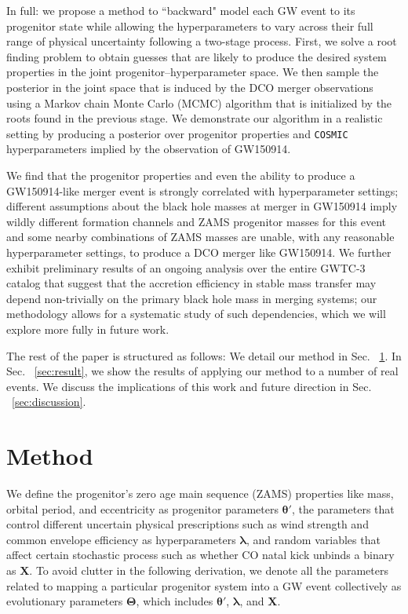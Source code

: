 \documentclass[twocolumn]{aastex631}
\begin{document}
In full: we propose a method to ``backward" model each GW event to its
progenitor state while allowing the hyperparameters to vary across their full
range of physical uncertainty following a two-stage process. First, we solve a
root finding problem to obtain guesses that are likely to produce the desired
system properties in the joint progenitor--hyperparameter space. We then sample
the posterior in the joint space that is induced by the DCO merger observations
using a Markov chain Monte Carlo (MCMC) algorithm that is initialized by the
roots found in the previous stage.  We demonstrate our algorithm in a realistic
setting by producing a posterior over progenitor properties and \texttt{COSMIC}
hyperparameters implied by the observation of GW150914.  

We find that the progenitor properties and even the ability to produce a
GW150914-like merger event is strongly correlated with hyperparameter settings;
different assumptions about the black hole masses at merger in GW150914 imply
wildly different formation channels and ZAMS progenitor masses for this event
and some nearby combinations of ZAMS masses are unable, with any reasonable
hyperparameter settings, to produce a DCO merger like GW150914.  We further
exhibit preliminary results of an ongoing analysis over the entire GWTC-3
catalog \citep{GWTC-3} that suggest that the accretion efficiency in stable mass
transfer may depend non-trivially on the primary black hole mass in merging
systems; our methodology allows for a systematic study of such dependencies,
which we will explore more fully in future work.

The rest of the paper is structured as
follows: We detail our method in Sec. ~\ref{sec:method}. In Sec.
~\ref{sec:result}, we show the results of applying our method to a number of
real events. We discuss the implications of this work and future direction in
Sec. ~\ref{sec:discussion}.

\section{Method}
\label{sec:method}


We define the progenitor's zero age main sequence (ZAMS) properties like
mass, orbital period, and eccentricity as progenitor parameters $\bm{\theta'}$, the parameters
that control different uncertain physical prescriptions such as wind strength and common
envelope efficiency as hyperparameters $\bm{\lambda}$, and random variables
that affect certain stochastic process such as whether CO natal kick unbinds a
binary as $\bm{X}$. To avoid clutter in the following derivation, we denote all
the parameters related to mapping a particular progenitor system into a GW event
collectively as evolutionary parameters $\bm{\Theta}$, which includes
$\bm{\theta'}$, $\bm{\lambda}$, and $\bm{X}$.
\end{document}
